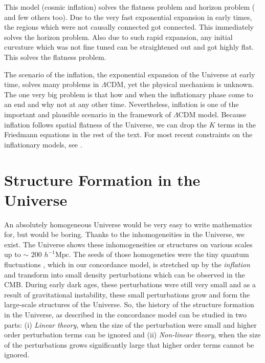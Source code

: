 This model (cosmic inflation) solves the flatness problem and horizon problem (
and few others too). Due to the very fast exponential expansion in early times, the
regions which were not causally connected got connected. This immediately solves
the horizon problem. Also due to such rapid expansion, any initial curvature which
was not fine tuned can be straightened out and got highly flat. This solves the
flatness problem. 

The scenario of the inflation, the exponential expansion of the Universe at 
early time, solves many problems in $\Lambda$CDM, yet the physical mechanism
is unknown. The one very big problem is that how and when the inflationary phase come
to an end and why not at any other time. Nevertheless, inflation is one of the
important and plausible scenario in the framework of $\Lambda$CDM model. Because
inflation follows spatial flatness  of the Universe, 
we can drop the $K$ terms in the Friedmann
equations in the rest of the text. For most recent constraints on 
the inflationary models, see \cite{2015arXiv150202114P}.

\section{Structure Formation in the Universe}

An absolutely homogeneous Universe would be very easy to write mathematics for, but 
would be boring. Thanks to the inhomogeneities in the Universe, we exist. The Universe
shows these inhomogeneities or structures on various scales up to $\sim$ 
200 $h^{-1} \mathrm{Mpc}$. The seeds
of those homogeneties were the tiny quantum fluctuations \citep{1939Phy.....6..899S}
, which in our concordance 
model, is stretched up by the {\it inflation} and transform into small density
perturbations which can be observed in the CMB. 
During early dark ages, these perturbations were still very small and as 
a result of gravitational instability, these small perturbations 
grow and form the large-scale structures of the Universe. 
So, the history of the  structure formation in the Universe, as described in the 
concordance model can be studied in two parts: (i) {\it Linear theory}, when
the size of the perturbation were small and higher order perturbation terms can be ignored and 
(ii) {\it Non-linear theory}, when the size of the perturbations grows significantly
large that higher order terms cannot be ignored.


